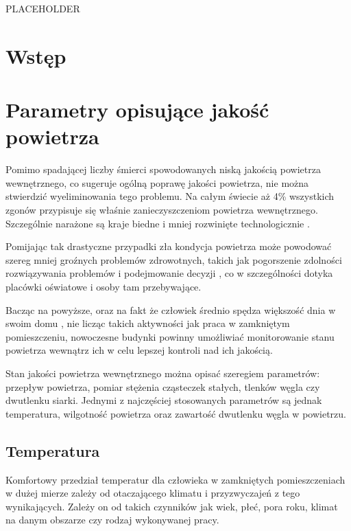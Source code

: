 




\vspace*{\fill}

PLACEHOLDER

\vspace*{\fill}

\newpage

\section{Wstęp}

\section{Parametry opisujące jakość powietrza}

Pomimo spadającej liczby śmierci spowodowanych niską jakością powietrza 
wewnętrznego, co sugeruje ogólną poprawę jakości powietrza, nie można 
stwierdzić wyeliminowania tego problemu. Na całym świecie aż 4\% wszystkich 
zgonów przypisuje się właśnie zanieczyszczeniom powietrza wewnętrznego. 
Szczególnie narażone są kraje biedne i mniej rozwinięte technologicznie \cite{owid}.

Pomijając tak drastyczne przypadki zła kondycja powietrza może powodować szereg mniej 
groźnych problemów zdrowotnych, takich jak pogorszenie zdolności rozwiązywania 
problemów i podejmowanie decyzji \cite{co2-effects}, co w szczególności dotyka placówki oświatowe i 
osoby tam przebywające. 

Bacząc na powyższe, oraz na fakt że człowiek średnio spędza większość dnia w swoim 
domu \cite{time-indoors}, nie licząc takich aktywności jak praca w zamkniętym pomieszczeniu, nowoczesne 
budynki powinny umożliwiać monitorowanie stanu powietrza wewnątrz 
ich w celu lepszej kontroli nad ich jakością.

Stan jakości powietrza wewnętrznego można opisać szeregiem parametrów: przepływ powietrza, 
pomiar stężenia cząsteczek stałych, tlenków węgla czy dwutlenku siarki. Jednymi z 
najczęściej stosowanych parametrów są jednak temperatura, wilgotność powietrza oraz 
zawartość dwutlenku węgla w powietrzu. 

\subsection{Temperatura}

Komfortowy przedział temperatur dla człowieka w zamkniętych pomieszczeniach w dużej 
mierze zależy od otaczającego klimatu i przyzwyczajeń z tego wynikających. Zależy on od takich czynników 
jak wiek, płeć, pora roku, klimat na danym obszarze czy rodzaj wykonywanej pracy.

